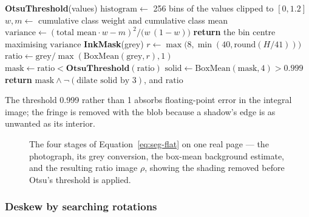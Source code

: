 \begin{algorithm}[!htbp]
\caption{Lighting normalisation and the ink mask}
\label{alg:seg-ink}
\begin{algorithmic}[1]
\STATE \textbf{OtsuThreshold}(values) 
\STATE \quad $\mathrm{histogram}\leftarrow$ 256 bins of the values clipped to $[0,1.2]$
\STATE \quad $w,m\leftarrow$ cumulative class weight and cumulative class mean
\STATE \quad $\mathrm{variance}\leftarrow(\text{total mean}\cdot w-m)^2/\bigl(w\,(1-w)\bigr)$
\STATE \quad \textbf{return} the bin centre maximising $\mathrm{variance}$
\STATE
\STATE \textbf{InkMask}(grey)
\STATE \quad $r\leftarrow\max\bigl(8,\min(40,\mathrm{round}(H/41))\bigr)$ 
\STATE \quad $\mathrm{ratio}\leftarrow \mathrm{grey}/\max(\mathrm{BoxMean}(\mathrm{grey},r),1)$ 
\STATE \quad $\mathrm{mask}\leftarrow \mathrm{ratio}<\textbf{OtsuThreshold}(\mathrm{ratio})$
\STATE \quad $\mathrm{solid}\leftarrow \mathrm{BoxMean}(\mathrm{mask},4)>0.999$ 
\STATE \quad \textbf{return} $\mathrm{mask}\wedge\neg(\text{dilate }\mathrm{solid}\text{ by }3)$, and $\mathrm{ratio}$
\end{algorithmic}
\end{algorithm}

The threshold 0.999 rather than 1 absorbs floating-point error in the integral image; the fringe is removed with the blob because a shadow's edge is as unwanted as its interior.

\begin{figure}[htb]
\centering
{}
\caption{The four stages of Equation~\ref{eq:seg-flat} on one real page --- the photograph, its grey conversion, the box-mean background estimate, and the resulting ratio image $\rho$, showing the shading removed before Otsu's threshold is applied.}
\label{fig:seg-flat-fig}
\end{figure}

\subsubsection{Deskew by searching rotations}

